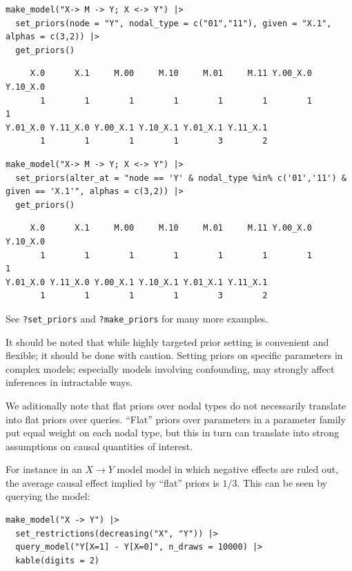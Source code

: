 \documentclass[
  article]{jss}
\begin{document}
\begin{verbatim}
make_model("X-> M -> Y; X <-> Y") |>
  set_priors(node = "Y", nodal_type = c("01","11"), given = "X.1", alphas = c(3,2)) |>
  get_priors()
\end{verbatim}

\begin{verbatim}
     X.0      X.1     M.00     M.10     M.01     M.11 Y.00_X.0 Y.10_X.0 
       1        1        1        1        1        1        1        1 
Y.01_X.0 Y.11_X.0 Y.00_X.1 Y.10_X.1 Y.01_X.1 Y.11_X.1 
       1        1        1        1        3        2 
\end{verbatim}

\begin{verbatim}
make_model("X-> M -> Y; X <-> Y") |>
  set_priors(alter_at = "node == 'Y' & nodal_type %in% c('01','11') & given == 'X.1'", alphas = c(3,2)) |>
  get_priors()
\end{verbatim}

\begin{verbatim}
     X.0      X.1     M.00     M.10     M.01     M.11 Y.00_X.0 Y.10_X.0 
       1        1        1        1        1        1        1        1 
Y.01_X.0 Y.11_X.0 Y.00_X.1 Y.10_X.1 Y.01_X.1 Y.11_X.1 
       1        1        1        1        3        2 
\end{verbatim}

See \texttt{?set\_priors} and \texttt{?make\_priors} for many more
examples.

It should be noted that while highly targeted prior setting is
convenient and flexible; it should be done with caution. Setting priors
on specific parameters in complex models; especially models involving
confounding, may strongly affect inferences in intractable ways.

We aditionally note that flat priors over nodal types do not necessarily
translate into flat priors over queries. ``Flat'' priors over parameters
in a parameter family put equal weight on each nodal type, but this in
turn can translate into strong assumptions on causal quantities of
interest.

For instance in an \(X \rightarrow Y\) model model in which negative
effects are ruled out, the average causal effect implied by ``flat''
priors is \(1/3\). This can be seen by querying the model:

\begin{verbatim}
make_model("X -> Y") |>
  set_restrictions(decreasing("X", "Y")) |>
  query_model("Y[X=1] - Y[X=0]", n_draws = 10000) |>
  kable(digits = 2)
\end{verbatim}
\end{document}
